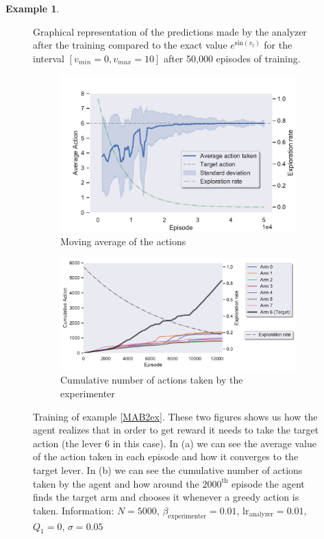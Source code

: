 \documentclass[11pt,a4paper,twoside]{report}
\newcommand{\+}{\textnormal{+} }
\theoremstyle{definition}
\newtheorem{myex}[mythm]{Example}
\numberwithin{equation}{chapter}
\begin{document}
\begin{myex}
\begin{figure}
      \caption{Graphical representation of the predictions made by the analyzer
      after the training compared to the exact value $e^{\text{sin}(v_t)}$ for 
      the interval $[v_{min}=0,v_{max}=10]$ after 50,000 episodes of training.}
      \label{performanceMBA2}
    \end{figure}


    \begin{figure}[]
      \centering
      \begin{subfigure}{.5\textwidth}
        \centering
        \includegraphics[width=1\linewidth]{figures/Actions-MAB2.pdf}
        \caption{Moving average of the actions}
        \label{fig:ActionAverageMAB2}
      \end{subfigure}%
      \begin{subfigure}{.5\textwidth}
        \centering
        \includegraphics[width=1\linewidth]{figures/Cum-action-MAB2.pdf}
        \caption{Cumulative number of actions taken by the experimenter}
        \label{fig:actionsMAB2}
      \end{subfigure}
      \caption{Training of example \ref{MAB2ex}. These two figures shows us how
      the agent realizes that in order to get reward it needs to take the target
      action (the lever 6 in this case). In (a) we can see the average value of
      the action taken in each episode and how it converges to the target lever.
      In (b) we can see the cumulative number of actions taken by the agent and
      how around the $2000^\text{th}$ episode the agent finds the target arm and
      chooses it whenever a greedy action is taken. Information: $N=5000$,
      $\beta_\text{experimenter}=0.01$, $\text{lr}_\text{analyzer}=0.01$,
      $Q_1=0$, $\sigma=0.05$}
    \end{figure}


\end{myex}
\end{document}
